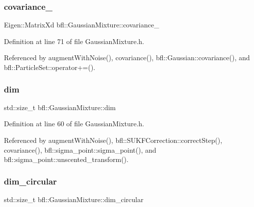 \mbox{\label{classbfl_1_1GaussianMixture_aab086cc1a89a8b7efd15303853e52920}} 
\subsubsection{\texorpdfstring{covariance\+\_\+}{covariance\_}}
{\footnotesize\ttfamily Eigen\+::\+Matrix\+Xd bfl\+::\+Gaussian\+Mixture\+::covariance\+\_\+\hspace{0.3cm}{\ttfamily [protected]}}



Definition at line 71 of file Gaussian\+Mixture.\+h.



Referenced by augment\+With\+Noise(), covariance(), bfl\+::\+Gaussian\+::covariance(), and bfl\+::\+Particle\+Set\+::operator+=().

\mbox{\label{classbfl_1_1GaussianMixture_a3f2b18801e72fa3bf0d6edc778662a8d}} 
\subsubsection{\texorpdfstring{dim}{dim}}
{\footnotesize\ttfamily std\+::size\+\_\+t bfl\+::\+Gaussian\+Mixture\+::dim}



Definition at line 60 of file Gaussian\+Mixture.\+h.



Referenced by augment\+With\+Noise(), bfl\+::\+S\+U\+K\+F\+Correction\+::correct\+Step(), covariance(), bfl\+::sigma\+\_\+point\+::sigma\+\_\+point(), and bfl\+::sigma\+\_\+point\+::unscented\+\_\+transform().

\mbox{\label{classbfl_1_1GaussianMixture_a23f3b92753266475a9bff8ee7e1c9518}} 
\subsubsection{\texorpdfstring{dim\+\_\+circular}{dim\_circular}}
{\footnotesize\ttfamily std\+::size\+\_\+t bfl\+::\+Gaussian\+Mixture\+::dim\+\_\+circular}



